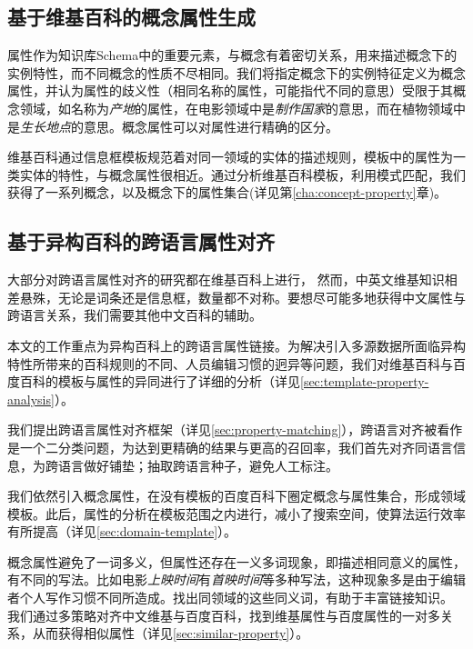 \subsection{基于维基百科的概念属性生成}
属性作为知识库Schema中的重要元素，与概念有着密切关系，用来描述概念下的实例特性，而不同概念的性质不尽相同。我们将指定概念下的实例特征定义为概念属性，并认为属性的歧义性（相同名称的属性，可能指代不同的意思）受限于其概念领域，如名称为\textit{产地}的属性，在电影领域中是\textit{制作国家}的意思，而在植物领域中是\textit{生长地点}的意思。概念属性可以对属性进行精确的区分。

维基百科通过{\heiti 信息框模板}规范着对同一领域的实体的描述规则，模板中的属性为一类实体的特性，与概念属性很相近。通过分析维基百科模板，利用模式匹配，我们获得了一系列概念，以及概念下的属性集合(详见第\ref{cha:concept-property}章)。


\subsection{基于异构百科的跨语言属性对齐}
大部分对跨语言属性对齐的研究都在维基百科上进行，
然而，中英文维基知识相差悬殊，无论是词条还是信息框，数量都不对称。要想尽可能多地获得中文属性与跨语言关系，我们需要其他中文百科的辅助。

本文的工作重点为异构百科上的跨语言属性链接。为解决引入多源数据所面临异构特性所带来的百科规则的不同、人员编辑习惯的迥异等问题，我们对维基百科与百度百科的模板与属性的异同进行了详细的分析（详见\ref{sec:template-property-analysis}）。

我们提出跨语言属性对齐框架（详见\ref{sec:property-matching}），跨语言对齐被看作是一个二分类问题，为达到更精确的结果与更高的召回率，我们首先对齐同语言信息，为跨语言做好铺垫；抽取跨语言种子，避免人工标注。

我们依然引入概念属性，在没有模板的百度百科下圈定概念与属性集合，形成领域模板。此后，属性的分析在模板范围之内进行，减小了搜索空间，使算法运行效率有所提高（详见\ref{sec:domain-template}）。

概念属性避免了一词多义，但属性还存在一义多词现象，即描述相同意义的属性，有不同的写法。比如电影\textit{上映时间}有\textit{首映时间}等多种写法，这种现象多是由于编辑者个人写作习惯不同所造成。找出同领域的这些同义词，有助于丰富链接知识。
我们通过多策略对齐中文维基与百度百科，找到维基属性与百度属性的一对多关系，从而获得相似属性（详见\ref{sec:similar-property}）。

